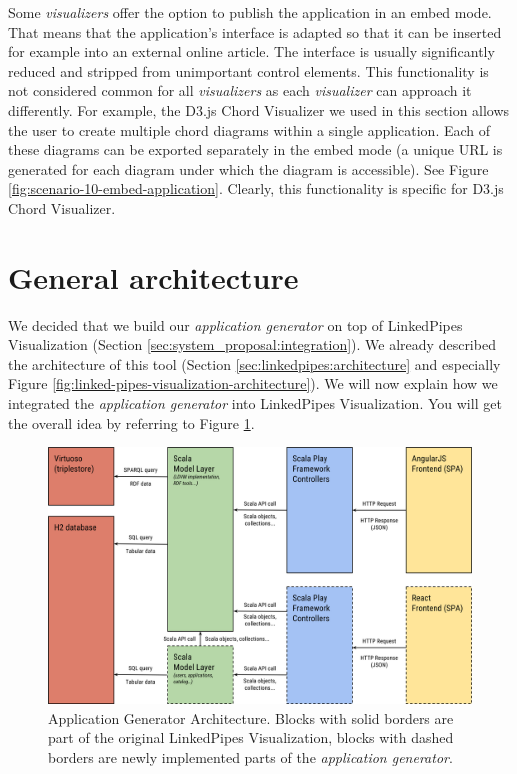 Some \emph{visualizers} offer the option to publish the application in an embed mode. That means that the application's interface is adapted so that it can be inserted for example into an external online article. The interface is usually significantly reduced and stripped from unimportant  control elements. This functionality is not considered common for all \emph{visualizers}  as each \emph{visualizer} can approach it differently. For example, the D3.js Chord Visualizer we used in this section allows the user to create multiple chord diagrams within a single application. Each of these diagrams can be exported separately in the embed mode (a unique URL is generated for each diagram under which the diagram is accessible). See Figure \ref{fig:scenario-10-embed-application}. Clearly, this functionality is specific for D3.js Chord Visualizer.

\section{General architecture}

We decided that we build our \emph{application generator} on top of LinkedPipes Visualization (Section \ref{sec:system_proposal:integration}). We already described the architecture of this tool (Section \ref{sec:linkedpipes:architecture} and especially Figure \ref{fig:linked-pipes-visualization-architecture}). We will now explain how we integrated the \emph{application generator} into LinkedPipes Visualization. You will get the overall idea by referring to Figure \ref{fig:application-generator-architecture}.

\begin{figure}
	\centering
	\includegraphics[width=140mm]{img/05_application_generator_architecture.png}
	\caption{Application Generator Architecture. Blocks with solid borders are part of the original LinkedPipes Visualization, blocks with dashed borders are newly implemented parts of the \emph{application generator}.} 
	\label{fig:application-generator-architecture}
\end{figure}

